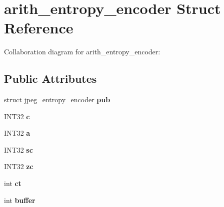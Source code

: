 \hypertarget{structarith__entropy__encoder}{\section{arith\+\_\+entropy\+\_\+encoder Struct Reference}
\label{structarith__entropy__encoder}
}


Collaboration diagram for arith\+\_\+entropy\+\_\+encoder\+:
\subsection*{Public Attributes}
\begin{DoxyCompactItemize}
\item 
\hypertarget{structarith__entropy__encoder_adaa616ab2a0f584358f8233775146d68}{struct \hyperlink{structjpeg__entropy__encoder}{jpeg\+\_\+entropy\+\_\+encoder} {\bfseries pub}}\label{structarith__entropy__encoder_adaa616ab2a0f584358f8233775146d68}

\item 
\hypertarget{structarith__entropy__encoder_a84198956e6633b09fda5713b89164292}{I\+N\+T32 {\bfseries c}}\label{structarith__entropy__encoder_a84198956e6633b09fda5713b89164292}

\item 
\hypertarget{structarith__entropy__encoder_afdfd4096eabee6a199afe6764b1ea35a}{I\+N\+T32 {\bfseries a}}\label{structarith__entropy__encoder_afdfd4096eabee6a199afe6764b1ea35a}

\item 
\hypertarget{structarith__entropy__encoder_aabd22ab89a4d488c9eebb109d91c3655}{I\+N\+T32 {\bfseries sc}}\label{structarith__entropy__encoder_aabd22ab89a4d488c9eebb109d91c3655}

\item 
\hypertarget{structarith__entropy__encoder_ad02520a5282d4d042bf39e8a50d6ddf8}{I\+N\+T32 {\bfseries zc}}\label{structarith__entropy__encoder_ad02520a5282d4d042bf39e8a50d6ddf8}

\item 
\hypertarget{structarith__entropy__encoder_af636dab56c69b209b0bb5aefba723e80}{int {\bfseries ct}}\label{structarith__entropy__encoder_af636dab56c69b209b0bb5aefba723e80}

\item 
\hypertarget{structarith__entropy__encoder_a404b730ace823b7212e4953146d02159}{int {\bfseries buffer}}\label{structarith__entropy__encoder_a404b730ace823b7212e4953146d02159}


\end{DoxyCompactItemize}
